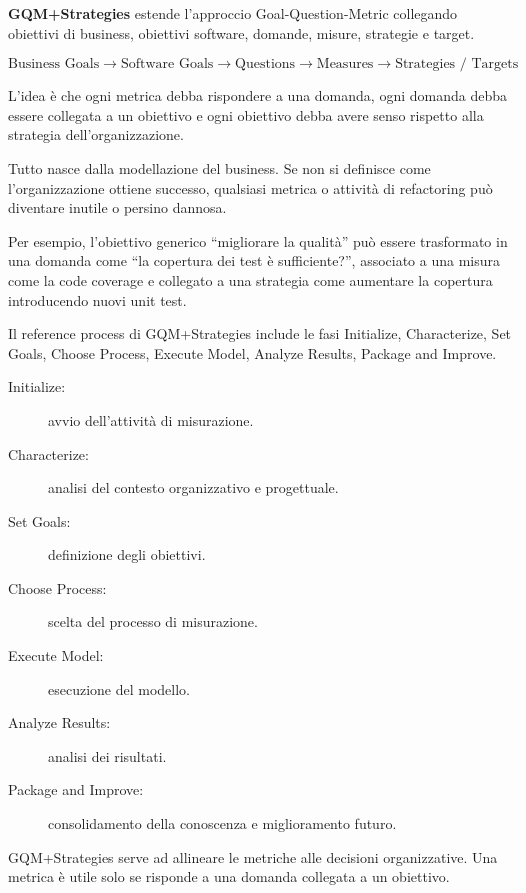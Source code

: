 \textbf{GQM+Strategies} estende l'approccio Goal-Question-Metric collegando obiettivi di business, obiettivi software, domande, misure, strategie e target.

\[
\text{Business Goals}
\rightarrow
\text{Software Goals}
\rightarrow
\text{Questions}
\rightarrow
\text{Measures}
\rightarrow
\text{Strategies / Targets}
\]

L'idea è che ogni metrica debba rispondere a una domanda, ogni domanda debba essere collegata a un obiettivo e ogni obiettivo debba avere senso rispetto alla strategia dell'organizzazione.

\begin{notaprof}
Tutto nasce dalla modellazione del business. Se non si definisce come l'organizzazione ottiene successo, qualsiasi metrica o attività di refactoring può diventare inutile o persino dannosa.
\end{notaprof}

Per esempio, l'obiettivo generico ``migliorare la qualità'' può essere trasformato in una domanda come ``la copertura dei test è sufficiente?'', associato a una misura come la code coverage e collegato a una strategia come aumentare la copertura introducendo nuovi unit test.

\begin{notaslide}
Il reference process di GQM+Strategies include le fasi Initialize, Characterize, Set Goals, Choose Process, Execute Model, Analyze Results, Package and Improve.
\end{notaslide}

\begin{description}
    \item[Initialize:] avvio dell'attività di misurazione.
    \item[Characterize:] analisi del contesto organizzativo e progettuale.
    \item[Set Goals:] definizione degli obiettivi.
    \item[Choose Process:] scelta del processo di misurazione.
    \item[Execute Model:] esecuzione del modello.
    \item[Analyze Results:] analisi dei risultati.
    \item[Package and Improve:] consolidamento della conoscenza e miglioramento futuro.
\end{description}

\begin{notaesame}
GQM+Strategies serve ad allineare le metriche alle decisioni organizzative. Una metrica è utile solo se risponde a una domanda collegata a un obiettivo.
\end{notaesame}


